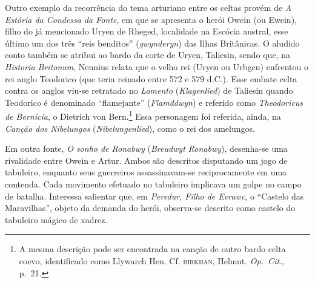 Outro exemplo da recorrência do tema arturiano entre os celtas provém de
\textit{A Estória da Condessa da Fonte}, em que se apresenta o herói
Owein (ou Ewein), filho do já mencionado Uryen de Rheged, localidade na
Escócia austral, esse último um dos três “reis benditos”
(\textit{gwynderyn}) das Ilhas Britânicas. O aludido conto também se
atribui ao bardo da corte de Uryen, Taliesin, sendo que, na
\textit{Historia Britonum}, Nennius relata que o velho rei (Uryen ou
Urbgen) enfrentou o rei anglo Teodorico (que teria reinado entre 572 e
579 d.C.). Esse embate celta contra os anglos viu-se retratado no
\textit{Lamento} (\textit{Klagenlied}) de Taliesin quando Teodorico é
denominado “flamejante” (\textit{Flamddwyn}) e referido como
\textit{Theodoricus de Bernicia}, o Dietrich von Bern.\footnote{ A mesma
descrição pode ser encontrada na canção de outro bardo celta coevo,
identificado como Llywarch Hen. Cf. \textsc{birkhan}, Helmut. \textit{Op.~Cit}.,
p.~21.} Essa personagem foi referida, ainda, na \textit{Canção dos
Nibelungos} (\textit{Nibelungenlied}), como o rei dos amelungos. 

Em outra fonte, \textit{O sonho de Ronabwy} (\textit{Breudwyt Ronabwy}),
desenha-se uma rivalidade entre Owein e Artur. Ambos são descritos
disputando um jogo de tabuleiro, enquanto seus guerreiros
assassinavam-se reciprocamente em uma contenda. Cada movimento efetuado
no tabuleiro implicava um golpe no campo de batalha. Interessa
salientar que, em \textit{Peredur, Filho de Evrawc}, o “Castelo das
Maravilhas”, objeto da demanda do herói, observa-se descrito como
castelo do tabuleiro mágico de xadrez. 

